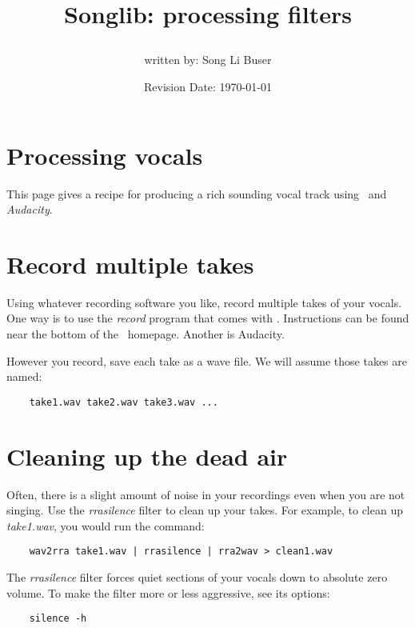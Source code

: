 \documentclass{article}
\title{Songlib: processing filters\\
\date{Revision Date: \today}}
\author{written by: Song Li Buser}
\begin{document}
\maketitle

\W\subsubsection*{}
\W\htmlrule

\section*{Processing vocals}

This page gives a recipe for producing a rich sounding vocal track using
\songlib\ and {\it Audacity}.

\section*{Record multiple takes}

Using whatever recording software you like, record multiple takes of
your vocals. One way is to use the {\it record} program that comes with
\Songlib. Instructions can be found near the bottom of the \Songlib\ 
homepage. Another is Audacity.

However you record, save each take as a wave file. We will assume those
takes are named:

\begin{verbatim}
    take1.wav take2.wav take3.wav ...
\end{verbatim}

\section*{Cleaning up the dead air}

Often, there is a slight amount of noise in your recordings even when
you are not singing. Use the {\it rrasilence} filter to clean up your takes.
For example, to clean up {\it take1.wav}, you would run the command:

\begin{verbatim}
    wav2rra take1.wav | rrasilence | rra2wav > clean1.wav
\end{verbatim}

The {\it rrasilence} filter forces quiet sections of your vocals down to
absolute zero volume. To make the filter more or less aggressive,
see its options:

\begin{verbatim}
    silence -h
\end{verbatim}
\end{document}
